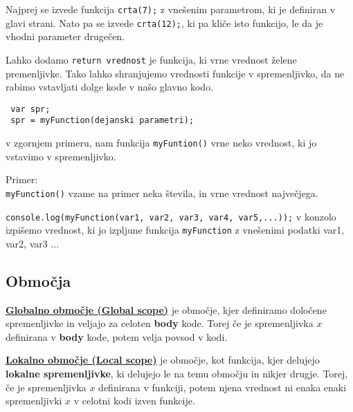 Najprej se izvede funkcija \texttt{crta(7);} z vnešenim parametrom, ki je definiran v glavi strani. Nato pa se izvede \texttt{crta(12);}, ki pa kliče isto funkcijo, le da je vhodni parameter drugečen.

Lahko dodamo  \texttt{return vrednost} je funkcija, ki vrne vrednost želene premenljivke.
Tako lahko shranjujemo vrednosti funkcije v spremenljivko, da ne rabimo vstavljati dolge kode v našo glavno kodo.

\begin{verbatim}
 var spr;
 spr = myFunction(dejanski parametri);
\end{verbatim}
v zgornjem primeru, nam funkcija \texttt{myFuntion()} vrne neko vrednost, ki jo vstavimo v spremenljivko.

Primer:\\
\texttt{myFunction()} vzame na primer neka števila, in vrne vrednost največjega.

\texttt{console.log(myFunction(var1, var2, var3, var4, var5,...));} v konzolo izpišemo vrednost, ki jo izpljune funkcija \texttt{myFunction} z vnešenimi podatki var1, var2, var3 ...

\subsection*{Območja}

\underline{\textbf{Globalno območje (Global scope)}} je območje, kjer definiramo določene spremenljivke in veljajo za celoten \textbf{body} kode. Torej če je spremenljivka $x$ definirana v \textbf{body} kode, potem velja povsod v kodi.

\textbf{\underline{Lokalno območje (Local scope)}} je območje, kot funkcija, kjer delujejo \textbf{lokalne spremenljivke}, ki delujejo le na temu območju in nikjer drugje. Torej, če je spremenljivka $x$ definirana v funkciji, potem njena vrednost ni enaka enaki spremenljivki $x$ v celotni kodi izven funkcije.

